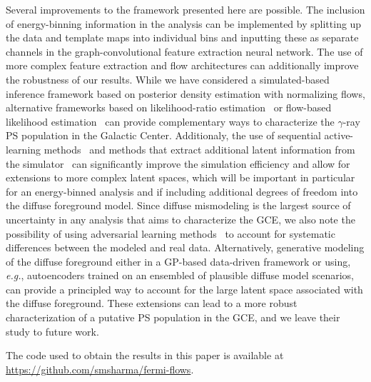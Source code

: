 \documentclass[prd,aps,10pt,nofootinbib,twocolumn,superscriptaddress,preprintnumbers,balancelastpage,longbibliography]{revtex4-1}
\begin{document}
Several improvements to the framework presented here are possible. The inclusion of energy-binning information in the analysis can be implemented by splitting up the data and template maps into individual bins and inputting these as separate channels in the graph-convolutional feature extraction neural network. The use of more complex feature extraction and flow architectures can additionally improve the robustness of our results. While we have considered a simulated-based inference framework based on posterior density estimation with normalizing flows, alternative frameworks based on likelihood-ratio estimation~\cite{Brehmer:2018eca,Brehmer:2018hga,Brehmer:2018kdj,Cranmer:2015bka, Hermans:2019ioj,Miller:2020hua,Miller:2021hys} or flow-based likelihood estimation~\cite{winkler2019learning,papamakarios2019sequential} can provide complementary ways to characterize the $\gamma$-ray PS population in the Galactic Center. Additionaly, the use of sequential active-learning methods~\cite{papamakarios2019sequential} and methods that extract additional latent information from the simulator~\cite{Brehmer:2018eca,Brehmer:2018hga,Brehmer:2018kdj,Brehmer:2019xox,Stoye:2018ovl} can significantly improve the simulation efficiency and allow for extensions to more complex latent spaces, which will be important in particular for an energy-binned analysis and if including additional degrees of freedom into the diffuse foreground model. 
Since diffuse mismodeling is the largest source of uncertainty in any analysis that aims to characterize the GCE, we also note the possibility of using adversarial learning methods~\cite{Louppe:2016ylz} to account for systematic differences between the modeled and real \Fermi data. Alternatively, generative modeling of the diffuse foreground either in a GP-based data-driven framework or using, \emph{e.g.}, autoencoders trained on an ensembled of plausible diffuse model scenarios, can provide a principled way to account for the large latent space associated with the diffuse foreground. These extensions can lead to a more robust characterization of a putative PS population in the GCE, and we leave their study to future work.

The code used to obtain the results in this paper is available at \url{https://github.com/smsharma/fermi-flows}.


\vspace{.3cm}
\end{document}
